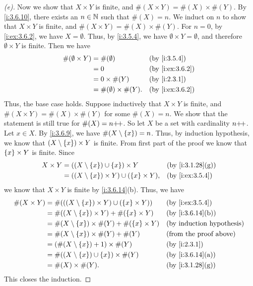 \begin{proof}[(e)]
  Now we show that \(X \times Y\) is finite, and \(\#(X \times Y) = \#(X) \times \#(Y)\).
  By \cref{i:3.6.10}, there exists an \(n \in \mathbb{N}\) such that \(\#(X) = n\).
  We induct on \(n\) to show that \(X \times Y\) is finite, and \(\#(X \times Y) = \#(X) \times \#(Y)\).
  For \(n = 0\), by \cref{i:ex:3.6.2}, we have \(X = \emptyset\).
  Thus, by \cref{i:3.5.4}, we have \(\emptyset \times Y = \emptyset\), and therefore \(\emptyset \times Y\) is finite.
  Then we have
  \begin{align*}
    \#(\emptyset \times Y) & = \#(\emptyset)               &  & \by{i:3.5.4}    \\
                           & = 0                           &  & \by{i:ex:3.6.2} \\
                           & = 0 \times \#(Y)              &  & \by{i:2.3.1}    \\
                           & = \#(\emptyset) \times \#(Y). &  & \by{i:ex:3.6.2}
  \end{align*}
  Thus, the base case holds.
  Suppose inductively that \(X \times Y\) is finite, and \(\#(X \times Y) = \#(X) \times \#(Y)\) for some \(\#(X) = n\).
  We show that the statement is still true for \(\#(X) = n{+}\!{+}\).
  So let \(X\) be a set with cardinality \(n{+}\!{+}\).
  Let \(x \in X\).
  By \cref{i:3.6.9}, we have \(\#(X \setminus \left\lbrace x\right\rbrace) = n\).
  Thus, by induction hypothesis, we know that \((X \setminus \left\lbrace x\right\rbrace) \times Y\) is finite.
  From first part of the proof we know that \(\left\lbrace x\right\rbrace \times Y\) is finite.
  Since
  \begin{align*}
    X \times Y & = ((X \setminus \set{x}) \cup \set{x}) \times Y             &  & \by{i:3.1.28}[g] \\
               & = ((X \setminus \set{x}) \times Y) \cup (\set{x} \times Y), &  & \by{i:ex:3.5.4}
  \end{align*}
  we know that \(X \times Y\) is finite by \cref{i:3.6.14}(b).
  Thus, we have
  \begin{align*}
    \#(X \times Y) & = \#(((X \setminus \set{x}) \times Y) \cup (\set{x} \times Y)) &  & \by{i:ex:3.5.4}               \\
                   & = \#((X \setminus \set{x}) \times Y) + \#(\set{x} \times Y)    &  & \by{i:3.6.14}[b]              \\
                   & = \#(X \setminus \set{x}) \times \#(Y) + \#(\set{x} \times Y)  &  & \byIH                         \\
                   & = \#(X \setminus \set{x}) \times \#(Y) + \#(Y)                 &  & \text{(from the proof above)} \\
                   & = (\#(X \setminus \set{x}) + 1) \times \#(Y)                   &  & \by{i:2.3.1}                  \\
                   & = \#((X \setminus \set{x}) \cup \set{x}) \times \#(Y)          &  & \by{i:3.6.14}[a]              \\
                   & = \#(X) \times \#(Y).                                          &  & \by{i:3.1.28}[g]
  \end{align*}
  This closes the induction.
\end{proof}

